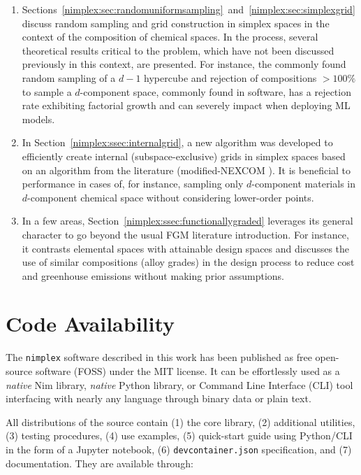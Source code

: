 \begin{enumerate}
    
    \item Sections~\ref{nimplex:sec:randomuniformsampling}~and~\ref{nimplex:sec:simplexgrid} discuss random sampling and grid construction in simplex spaces in the context of the composition of chemical spaces. In the process, several theoretical results critical to the problem, which have not been discussed previously in this context, are presented. For instance, the commonly found random sampling of a $d-1$ hypercube and rejection of compositions $>100\%$ to sample a $d$-component space, commonly found in software, has a rejection rate exhibiting factorial growth and can severely impact when deploying ML models.
    
    \item In Section~\ref{nimplex:ssec:internalgrid}, a new algorithm was developed to efficiently create internal (subspace-exclusive) grids in simplex spaces based on an algorithm from the literature (modified-NEXCOM \cite{Chasalow1995AlgorithmPoints}). It is beneficial to performance in cases of, for instance, sampling only $d$-component materials in $d$-component chemical space without considering lower-order points.

    \item In a few areas, Section~\ref{nimplex:ssec:functionallygraded} leverages its general character to go beyond the usual FGM literature introduction. For instance, it contrasts elemental spaces with attainable design spaces and discusses the use of similar compositions (alloy grades) in the design process to reduce cost and greenhouse emissions without making prior assumptions.
    
\end{enumerate}

\section{Code Availability} \label{nimplex:sec:code}

The \texttt{nimplex} software described in this work has been published as free open-source software (FOSS) under the MIT license. It can be effortlessly used as a \emph{native} Nim library, \emph{native} Python library, or Command Line Interface (CLI) tool interfacing with nearly any language through binary data or plain text.

All distributions of the source contain (1) the core library, (2) additional utilities, (3) testing procedures, (4) use examples, (5) quick-start guide using Python/CLI in the form of a Jupyter notebook, (6) \texttt{devcontainer.json} specification, and (7) documentation. They are available through:

